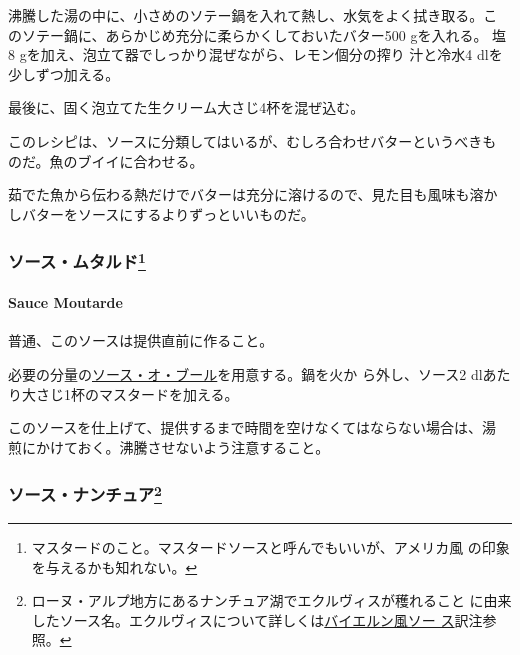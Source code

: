 \begin{recette}
沸騰した湯の中に、小さめのソテー鍋を入れて熱し、水気をよく拭き取る。こ
のソテー鍋に、あらかじめ充分に柔らかくしておいたバター500 gを入れる。
塩8 gを加え、泡立て器でしっかり混ぜながら、レモン\unquart{}個分の搾り
汁と冷水4 dlを少しずつ加える。

最後に、固く泡立てた生クリーム大さじ4杯を混ぜ込む。

このレシピは、ソースに分類してはいるが、むしろ合わせバターというべきも
のだ。魚のブイイに合わせる。

茹でた魚から伝わる熱だけでバターは充分に溶けるので、見た目も風味も溶か
しバターをソースにするよりずっといいものだ。

\maeaki

\hypertarget{ux30bdux30fcux30b9ux30e0ux30bfux30ebux30c991}{%
\subsubsection[ソース・ムタルド]{\texorpdfstring{ソース・ムタルド\footnote{マスタードのこと。マスタードソースと呼んでもいいが、アメリカ風
  の印象を与えるかも知れない。}}{ソース・ムタルド}}\label{ux30bdux30fcux30b9ux30e0ux30bfux30ebux30c991}}

\hypertarget{sauce-moutarde}{%
\paragraph{Sauce Moutarde}\label{sauce-moutarde}}


普通、このソースは提供直前に作ること。

必要の分量の\protect\hyperlink{sauce-au-beurre}{ソース・オ・ブール}を用意する。鍋を火か
ら外し、ソース2\undemi{} dlあたり大さじ1杯のマスタードを加える。

このソースを仕上げて、提供するまで時間を空けなくてはならない場合は、湯
煎にかけておく。沸騰させないよう注意すること。

\maeaki

\hypertarget{ux30bdux30fcux30b9ux30caux30f3ux30c1ux30e5ux30a292}{%
\subsubsection[ソース・ナンチュア]{\texorpdfstring{ソース・ナンチュア\footnote{ローヌ・アルプ地方にあるナンチュア湖でエクルヴィスが穫れること
  に由来したソース名。エクルヴィスについて詳しくは\protect\hyperlink{sauce-bavaroise}{バイエルン風ソー
  ス}訳注参照。}}{ソース・ナンチュア}}\label{ux30bdux30fcux30b9ux30caux30f3ux30c1ux30e5ux30a292}}


\end{recette}
